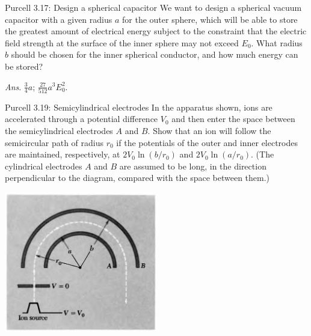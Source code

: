 \documentclass{esg8022pset}
\begin{document}
\begin{problem}{Purcell 3.17: Design a spherical capacitor}
  We want to design a spherical vacuum capacitor with a given
  radius $a$ for the outer sphere, which will be able to store the greatest 
  amount of electrical energy subject to the constraint that the electric 
  field strength at the surface of the inner sphere may not exceed $E_0$. 
  What radius $b$ should be chosen for the inner spherical conductor, and 
  how much energy can be stored? 
  
  \begin{flushright}\emph{Ans}. $\frac34 a$; $\frac{27}{512} a^3 E_0^2$.\end{flushright}
\end{problem}
\begin{solution}
  
\end{solution}





\begin{problem}{Purcell 3.19: Semicylindrical electrodes}
  In the apparatus shown, ions are accelerated through a potential difference $V_0$ and then enter the space between the semicylindrical electrodes $A$ and $B$. Show that an ion will follow the semicircular path of radius $r_0$ if the potentials of the outer and inner electrodes are maintained, respectively, at $2V_0\ln(b/r_0)$ and $2V_0\ln(a/r_0)$. (The cylindrical electrodes $A$ and $B$ are assumed to be long, in the direction perpendicular to the diagram, compared with the space between them.) 
  \begin{center}\includegraphics[width=0.5\textwidth]{ps04_06}\end{center}
\end{problem}
\begin{solution}

\end{solution}
\end{document}

